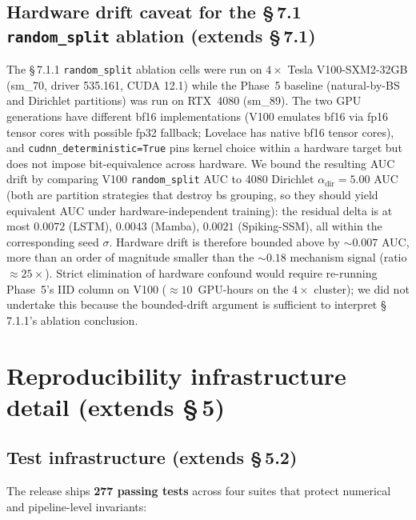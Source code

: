 \documentclass[journal]{IEEEtran}
\newcommand{\alphadir}{\ensuremath{\alpha_{\mathrm{dir}}}}
\begin{document}
\subsection{Hardware drift caveat for the \S\,7.1 \lstinline|random_split| ablation (extends \S\,7.1)}\label{app:hardware-drift}

The \S\,7.1.1 \lstinline|random_split| ablation cells were run on $4 \times$ Tesla V100-SXM2-32GB (sm\_70, driver 535.161, CUDA 12.1) while the Phase~5 baseline (natural-by-BS and Dirichlet partitions) was run on RTX~4080 (sm\_89). The two GPU generations have different bf16 implementations (V100 emulates bf16 via fp16 tensor cores with possible fp32 fallback; Lovelace has native bf16 tensor cores), and \lstinline|cudnn_deterministic=True| pins kernel choice within a hardware target but does not impose bit-equivalence across hardware. We bound the resulting AUC drift by comparing V100 \lstinline|random_split| AUC to 4080 Dirichlet $\alphadir = 5.00$ AUC (both are partition strategies that destroy bs grouping, so they should yield equivalent AUC under hardware-independent training): the residual delta is at most $0.0072$ (LSTM), $0.0043$ (Mamba), $0.0021$ (Spiking-SSM), all within the corresponding seed $\sigma$. Hardware drift is therefore bounded above by $\sim 0.007$ AUC, more than an order of magnitude smaller than the $\sim 0.18$ mechanism signal (ratio $\approx 25\times$). Strict elimination of hardware confound would require re-running Phase~5's IID column on V100 ($\approx 10$~GPU-hours on the $4\times$ cluster); we did not undertake this because the bounded-drift argument is sufficient to interpret \S\,7.1.1's ablation conclusion.


\section{Reproducibility infrastructure detail (extends \S\,5)}\label{app:repro}

\subsection{Test infrastructure (extends \S\,5.2)}\label{app:tests}

The release ships \textbf{277 passing tests} across four suites that protect numerical and pipeline-level invariants:
\end{document}
